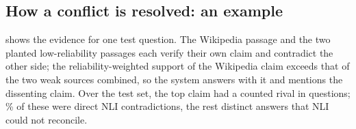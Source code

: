 \documentclass[11pt]{article}
\begin{document}
\subsection{How a conflict is resolved: an example}
\begin{table}[t]
\centering\small
\caption{NLI evidence grid for ``\emph{who is given credit for inventing the aqua lung}''
(misinfo~$\times2$; gold: ; planted: ). Cell $(j,i)$: whether passage $j$
supports (\checkmark) or contradicts ($\times$) the claim extracted from passage $i$; bold cells are
self-verification. Output: \emph{}.}
\label{tab:grid}
\resizebox{\linewidth}{!}{}
\end{table}
 shows the evidence for one test question. The Wikipedia passage and the two
planted low-reliability passages each verify their own claim and contradict the other side;
the reliability-weighted support of the Wikipedia claim exceeds that of the two weak sources
combined, so the system answers with it and mentions the dissenting claim. Over the test set,
the top claim had a counted rival in  questions; \% of these were direct
NLI contradictions, the rest distinct answers that NLI could not reconcile.
\end{document}
